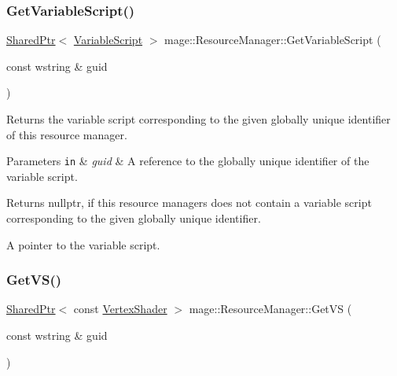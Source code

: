\subsubsection{\texorpdfstring{Get\+Variable\+Script()}{GetVariableScript()}}
{\footnotesize\ttfamily \hyperlink{namespacemage_a1e01ae66713838a7a67d30e44c67703e}{Shared\+Ptr}$<$ \hyperlink{classmage_1_1_variable_script}{Variable\+Script} $>$ mage\+::\+Resource\+Manager\+::\+Get\+Variable\+Script (\begin{DoxyParamCaption}\item[{const wstring \&}]{guid }\end{DoxyParamCaption})\hspace{0.3cm}{\ttfamily [noexcept]}}

Returns the variable script corresponding to the given globally unique identifier of this resource manager.


\begin{DoxyParams}[1]{Parameters}
\mbox{\tt in}  & {\em guid} & A reference to the globally unique identifier of the variable script. \\
\hline
\end{DoxyParams}
\begin{DoxyReturn}{Returns}
{\ttfamily nullptr}, if this resource managers does not contain a variable script corresponding to the given globally unique identifier. 

A pointer to the variable script. 
\end{DoxyReturn}
\hypertarget{classmage_1_1_resource_manager_a76e1c55d7c2e7b95b2ef92ebc8fcf200}{}\label{classmage_1_1_resource_manager_a76e1c55d7c2e7b95b2ef92ebc8fcf200} 
\subsubsection{\texorpdfstring{Get\+V\+S()}{GetVS()}}
{\footnotesize\ttfamily \hyperlink{namespacemage_a1e01ae66713838a7a67d30e44c67703e}{Shared\+Ptr}$<$ const \hyperlink{classmage_1_1_vertex_shader}{Vertex\+Shader} $>$ mage\+::\+Resource\+Manager\+::\+Get\+VS (\begin{DoxyParamCaption}\item[{const wstring \&}]{guid }\end{DoxyParamCaption})\hspace{0.3cm}{\ttfamily [noexcept]}}

